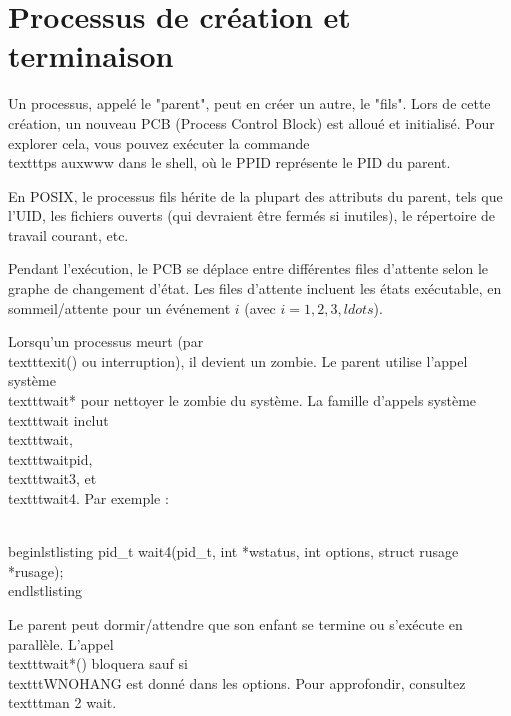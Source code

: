 \documentclass[12pt]{article}
\begin{document}
\maketitle
\tableofcontents
\newpage

\section{Processus de création et terminaison}

Un processus, appelé le "parent", peut en créer un autre, le "fils". Lors de cette création, un nouveau PCB (Process Control Block) est alloué et initialisé. Pour explorer cela, vous pouvez exécuter la commande \\texttt{ps auxwww} dans le shell, où le PPID représente le PID du parent.

En POSIX, le processus fils hérite de la plupart des attributs du parent, tels que l'UID, les fichiers ouverts (qui devraient être fermés si inutiles), le répertoire de travail courant, etc.

Pendant l'exécution, le PCB se déplace entre différentes files d'attente selon le graphe de changement d'état. Les files d'attente incluent les états exécutable, en sommeil/attente pour un événement \(i\) (avec \(i=1,2,3,ldots\)).

Lorsqu'un processus meurt (par \\texttt{exit()} ou interruption), il devient un zombie. Le parent utilise l'appel système \\texttt{wait*} pour nettoyer le zombie du système. La famille d'appels système \\texttt{wait} inclut \\texttt{wait}, \\texttt{waitpid}, \\texttt{wait3}, et \\texttt{wait4}. Par exemple :

\\begin{lstlisting}
pid_t wait4(pid_t, int *wstatus, int options, struct rusage *rusage);
\\end{lstlisting}

Le parent peut dormir/attendre que son enfant se termine ou s'exécute en parallèle. L'appel \\texttt{wait*()} bloquera sauf si \\texttt{WNOHANG} est donné dans les options. Pour approfondir, consultez \\texttt{man 2 wait}.
\end{document}
